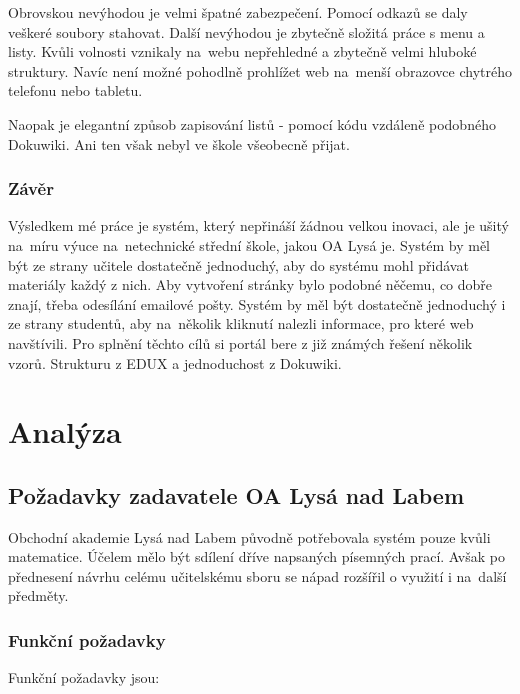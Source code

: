 \documentclass[thesis=B,czech]{FITthesis}[2012/06/26]
\begin{document}
Obrovskou nevýhodou je velmi špatné zabezpečení. Pomocí odkazů se daly veškeré soubory stahovat. Další nevýhodou je zbytečně složitá práce s menu a listy. Kvůli volnosti vznikaly na~webu nepřehledné a zbytečně velmi hluboké struktury. Navíc není možné pohodlně prohlížet web na~menší obrazovce chytrého telefonu nebo tabletu.

Naopak je elegantní způsob zapisování listů - pomocí kódu vzdáleně podobného Dokuwiki. Ani ten však nebyl ve škole všeobecně přijat.

\subsection{Závěr}

Výsledkem mé práce je systém, který nepřináší žádnou velkou inovaci, ale je ušitý na~míru výuce na~netechnické střední škole, jakou OA Lysá je. Systém by měl být ze strany učitele dostatečně jednoduchý, aby do systému mohl přidávat materiály každý z nich. Aby vytvoření stránky bylo podobné něčemu, co dobře znají, třeba odesílání emailové pošty. Systém by měl být dostatečně jednoduchý i ze strany studentů, aby na~několik kliknutí nalezli informace, pro které web navštívili. Pro splnění těchto cílů si portál bere z již známých řešení několik vzorů. Strukturu z EDUX a jednoduchost z Dokuwiki.


\chapter{Analýza}

\section{Požadavky zadavatele OA Lysá nad Labem}

Obchodní akademie Lysá nad Labem původně potřebovala systém pouze kvůli matematice. Účelem mělo být sdílení dříve napsaných písemných prací. Avšak po přednesení návrhu celému učitelskému sboru se nápad rozšířil o využití i na~další předměty.

\subsection{Funkční požadavky}

Funkční požadavky  jsou:
\end{document}

